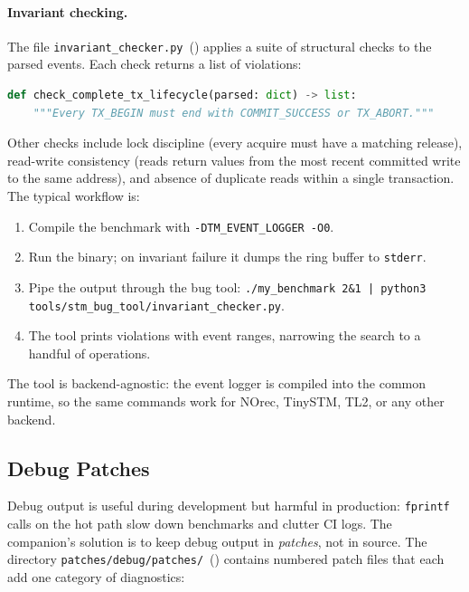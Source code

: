 \paragraph{Invariant checking.}
The file \texttt{invariant\_checker.py}~()
applies a suite of structural checks to the parsed events.  Each check
returns a list of violations:

\begin{lstlisting}[language=Python, caption={Lifecycle checker signature.}]
def check_complete_tx_lifecycle(parsed: dict) -> list:
    """Every TX_BEGIN must end with COMMIT_SUCCESS or TX_ABORT."""
\end{lstlisting}

\noindent
Other checks include lock discipline (every acquire must have a matching
release), read-write consistency (reads return values from the most
recent committed write to the same address), and absence of duplicate
reads within a single transaction.  The typical workflow is:

\begin{enumerate}
    \item Compile the benchmark with \texttt{-DTM\_EVENT\_LOGGER -O0}.
    \item Run the binary; on invariant failure it dumps the ring buffer to
          \texttt{stderr}.
    \item Pipe the output through the bug tool: \texttt{./my\_benchmark
          2\&1 | python3 tools/stm\_bug\_tool/invariant\_checker.py}.
    \item The tool prints violations with event ranges, narrowing the
          search to a handful of operations.
\end{enumerate}

The tool is backend-agnostic: the event logger is compiled into the
common runtime, so the same commands work for NOrec, TinySTM, TL2, or
any other backend.

\subsection{Debug Patches}
\label{sec:debug-patches}

Debug output is useful during development but harmful in production:
\texttt{fprintf} calls on the hot path slow down benchmarks and clutter
CI logs.  The companion's solution is to keep debug output in
\emph{patches}, not in source.  The directory
\texttt{patches/debug/patches/}~()
contains numbered patch files that each add one category of diagnostics:

